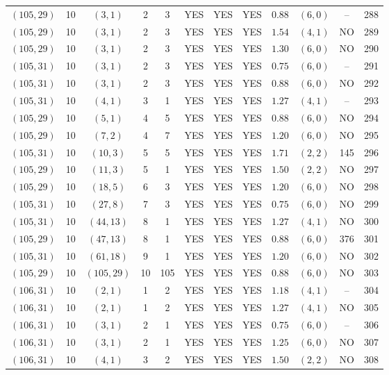 \begin{longtable}{|c|c|c|c|c|c|c|c|c|c|c|c|}
$(105,29)$ & 10 & $(3,1)$ & 2 & 3 & YES & YES & YES & $0.88$ & $(6,0)$ & -- & 288\\
$(105,29)$ & 10 & $(3,1)$ & 2 & 3 & YES & YES & YES & $1.54$ & $(4,1)$ & NO & 289\\
$(105,29)$ & 10 & $(3,1)$ & 2 & 3 & YES & YES & YES & $1.30$ & $(6,0)$ & NO & 290\\
$(105,31)$ & 10 & $(3,1)$ & 2 & 3 & YES & YES & YES & $0.75$ & $(6,0)$ & -- & 291\\
$(105,31)$ & 10 & $(3,1)$ & 2 & 3 & YES & YES & YES & $0.88$ & $(6,0)$ & NO & 292\\
$(105,31)$ & 10 & $(4,1)$ & 3 & 1 & YES & YES & YES & $1.27$ & $(4,1)$ & -- & 293\\
$(105,29)$ & 10 & $(5,1)$ & 4 & 5 & YES & YES & YES & $0.88$ & $(6,0)$ & NO & 294\\
$(105,29)$ & 10 & $(7,2)$ & 4 & 7 & YES & YES & YES & $1.20$ & $(6,0)$ & NO & 295\\
$(105,31)$ & 10 & $(10,3)$ & 5 & 5 & YES & YES & YES & $1.71$ & $(2,2)$ & 145 & 296\\
$(105,29)$ & 10 & $(11,3)$ & 5 & 1 & YES & YES & YES & $1.50$ & $(2,2)$ & NO & 297\\
$(105,29)$ & 10 & $(18,5)$ & 6 & 3 & YES & YES & YES & $1.20$ & $(6,0)$ & NO & 298\\
$(105,31)$ & 10 & $(27,8)$ & 7 & 3 & YES & YES & YES & $0.75$ & $(6,0)$ & NO & 299\\
$(105,31)$ & 10 & $(44,13)$ & 8 & 1 & YES & YES & YES & $1.27$ & $(4,1)$ & NO & 300\\
$(105,29)$ & 10 & $(47,13)$ & 8 & 1 & YES & YES & YES & $0.88$ & $(6,0)$ & 376 & 301\\
$(105,31)$ & 10 & $(61,18)$ & 9 & 1 & YES & YES & YES & $1.20$ & $(6,0)$ & NO & 302\\
$(105,29)$ & 10 & $(105,29)$ & 10 & 105 & YES & YES & YES & $0.88$ & $(6,0)$ & NO & 303\\
$(106,31)$ & 10 & $(2,1)$ & 1 & 2 & YES & YES & YES & $1.18$ & $(4,1)$ & -- & 304\\
$(106,31)$ & 10 & $(2,1)$ & 1 & 2 & YES & YES & YES & $1.27$ & $(4,1)$ & NO & 305\\
$(106,31)$ & 10 & $(3,1)$ & 2 & 1 & YES & YES & YES & $0.75$ & $(6,0)$ & -- & 306\\
$(106,31)$ & 10 & $(3,1)$ & 2 & 1 & YES & YES & YES & $1.25$ & $(6,0)$ & NO & 307\\
$(106,31)$ & 10 & $(4,1)$ & 3 & 2 & YES & YES & YES & $1.50$ & $(2,2)$ & NO & 308\\

\end{longtable}
